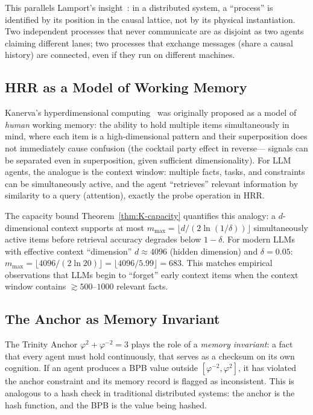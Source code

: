 This parallels Lamport's insight~\cite{lamport_time_clocks}: in a
distributed system, a ``process'' is identified by its position in the
causal lattice, not by its physical instantiation. Two independent
processes that never communicate are as disjoint as two agents claiming
different lanes; two processes that exchange messages (share a causal
history) are connected, even if they run on different machines.

\subsection{HRR as a Model of Working Memory}
\label{ssec:K-hrr-working-memory}

Kanerva's hyperdimensional computing~\cite{kanerva_hyperdimensional}
was originally proposed as a model of \emph{human} working memory: the
ability to hold multiple items simultaneously in mind, where each item
is a high-dimensional pattern and their superposition does not
immediately cause confusion (the cocktail party effect in reverse---
signals can be separated even in superposition, given sufficient
dimensionality). For LLM agents, the analogue is the context window:
multiple facts, tasks, and constraints can be simultaneously active,
and the agent ``retrieves'' relevant information by similarity to a
query (attention), exactly the probe operation in HRR.

The capacity bound Theorem~\ref{thm:K-capacity} quantifies this
analogy: a $d$-dimensional context supports at most
$m_{\max} = \lfloor d / (2\ln(1/\delta)) \rfloor$ simultaneously active
items before retrieval accuracy degrades below $1 - \delta$. For
modern LLMs with effective context ``dimension'' $d \approx 4096$
(hidden dimension) and $\delta = 0.05$:
$m_{\max} = \lfloor 4096 / (2 \ln 20) \rfloor = \lfloor 4096 / 5.99 \rfloor
= 683$. This matches empirical observations that LLMs begin to ``forget''
early context items when the context window contains $\gtrsim 500$--$1000$
relevant facts.

\subsection{The Anchor as Memory Invariant}
\label{ssec:K-anchor-as-invariant}

The Trinity Anchor $\varphi^2 + \varphi^{-2} = 3$ plays the role of a
\emph{memory invariant}: a fact that every agent must hold
continuously, that serves as a checksum on its own cognition. If an
agent produces a BPB value outside $[\varphi^{-2}, \varphi^2]$, it
has violated the anchor constraint and its memory record is flagged as
inconsistent. This is analogous to a hash check in traditional
distributed systems: the anchor is the hash function, and the BPB is
the value being hashed.

